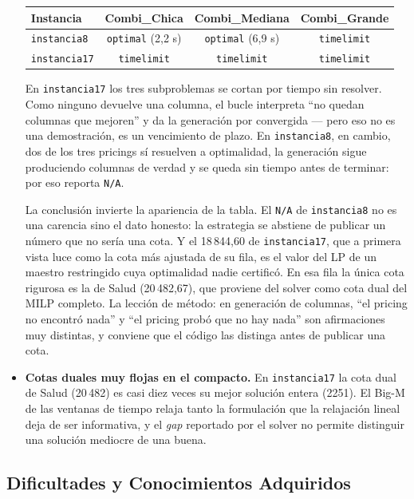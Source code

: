 \documentclass[12pt]{article}
\numberwithin{algorithm}{section}
\begin{document}
\begin{itemize}
    \begin{center}
    \begin{tabular}{|l|c|c|c|}
    \hline
    \textbf{Instancia} & \textbf{Combi\_Chica} & \textbf{Combi\_Mediana} & \textbf{Combi\_Grande} \\
    \hline
    \texttt{instancia8}  & \texttt{optimal} (2{,}2 s) & \texttt{optimal} (6{,}9 s) & \texttt{timelimit} \\
    \texttt{instancia17} & \texttt{timelimit} & \texttt{timelimit} & \texttt{timelimit} \\
    \hline
    \end{tabular}
    \end{center}

    En \texttt{instancia17} los tres subproblemas se cortan por tiempo sin resolver. Como ninguno devuelve una columna, el bucle interpreta ``no quedan columnas que mejoren'' y da la generación por convergida --- pero eso no es una demostración, es un vencimiento de plazo. En \texttt{instancia8}, en cambio, dos de los tres pricings sí resuelven a optimalidad, la generación sigue produciendo columnas de verdad y se queda sin tiempo antes de terminar: por eso reporta \texttt{N/A}.

    La conclusión invierte la apariencia de la tabla. El \texttt{N/A} de \texttt{instancia8} no es una carencia sino el dato honesto: la estrategia se abstiene de publicar un número que no sería una cota. Y el 18\,844{,}60 de \texttt{instancia17}, que a primera vista luce como la cota más ajustada de su fila, es el valor del LP de un maestro restringido cuya optimalidad nadie certificó. En esa fila la única cota rigurosa es la de Salud (20\,482{,}67), que proviene del solver como cota dual del MILP completo. La lección de método: en generación de columnas, ``el pricing no encontró nada'' y ``el pricing probó que no hay nada'' son afirmaciones muy distintas, y conviene que el código las distinga antes de publicar una cota.

    \item \textbf{Cotas duales muy flojas en el compacto.} En \texttt{instancia17} la cota dual de Salud (20\,482) es casi diez veces su mejor solución entera (2251). El Big-M de las ventanas de tiempo relaja tanto la formulación que la relajación lineal deja de ser informativa, y el \emph{gap} reportado por el solver no permite distinguir una solución mediocre de una buena.
\end{itemize}

\subsection{Dificultades y Conocimientos Adquiridos}
\end{document}
